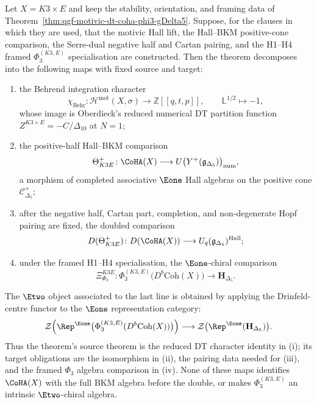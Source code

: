 \begin{proposition}
\label{prop:qgf-k3e-source-target-comparison-maps}
Let $X=K3\times E$ and keep the stability, orientation, and framing
data of Theorem~\ref{thm:qgf-motivic-dt-coha-phi3-gDelta5}. Suppose,
for the clauses in which they are used, that the motivic Hall lift, the
Hall--BKM positive-cone comparison, the Serre-dual negative half and
Cartan pairing, and the H1--H4 framed
$\Phi_3^{(K3,E)}$ specialisation are constructed. Then the theorem
decomposes into the following maps with fixed source and target:
\begin{enumerate}[label=\textup{(\roman*)}]
\item the Behrend integration character
\[
 \chi_{\mathrm{Behr}}\colon
 \mathcal H^{\mathrm{mot}}(X,\sigma)
 \longrightarrow
 \mathbb Z[\![q,t,p]\!],
 \qquad
 \mathbb L^{1/2}\mapsto -1,
\]
whose image is Oberdieck's reduced numerical DT partition function
$Z^{K3\times E}=-C/\Delta_{10}$ at $N=1$;
\item the positive-half Hall--BKM comparison
\[
 \Theta^+_{K3E}\colon
 \CoHA(X)
 \longrightarrow
 U\bigl(Y^+(\mathfrak g_{\Delta_5})\bigr)_{\mathrm{num}},
\]
a morphism of completed associative $\Eone$ Hall algebras on the
positive cone $\mathcal C_{\Delta_5}^+$;
\item after the negative half, Cartan part, completion, and
non-degenerate Hopf pairing are fixed, the doubled comparison
\[
 D(\Theta^+_{K3E})\colon
 D(\CoHA(X))
 \longrightarrow
 U_q(\mathfrak g_{\Delta_5})^{\mathrm{Hall}};
\]
\item under the framed H1--H4 specialisation, the $\Eone$-chiral
comparison
\[
 \Xi_{\Phi_3}^{K3E}\colon
 \Phi_3^{(K3,E)}\bigl(D^b\mathrm{Coh}(X)\bigr)
 \longrightarrow
 \mathbf H_{\Delta_5}.
\]
\end{enumerate}
The $\Etwo$ object associated to the last line is obtained by applying
the Drinfeld-centre functor to the $\Eone$ representation category:
\[
 \mathcal Z\!\left(
 \Rep^{\Eone}
 \bigl(\Phi_3^{(K3,E)}(D^b\mathrm{Coh}(X))\bigr)
 \right)
 \longrightarrow
 \mathcal Z\bigl(\Rep^{\Eone}(\mathbf H_{\Delta_5})\bigr).
\]
Thus the theorem's source theorem is the reduced DT character identity
in \textup{(i)}; its target obligations are the isomorphism in
\textup{(ii)}, the pairing data needed for \textup{(iii)}, and the
framed $\Phi_3$ algebra comparison in \textup{(iv)}. None of these
maps identifies $\CoHA(X)$ with the full BKM algebra before the double,
or makes $\Phi_3^{(K3,E)}$ an intrinsic $\Etwo$-chiral algebra.
\end{proposition}

